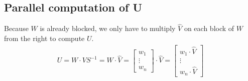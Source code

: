 \subsection{Parallel computation of U}

Because $W$ is already blocked, we only have to multiply  $\hat{ V }$ on each block of $W$ from the right to compute $U$.
\begin{align}
U = W \cdot VS^{-1} = 
W \cdot\hat{ V } = 
\begin{bmatrix} 
w_1 \\ \vdots \\ w_n  
\end{bmatrix} 
\cdot  \hat{ V } =  
\begin{bmatrix} 
w_1 \cdot  \hat{ V }  \\ \vdots \\ w_n \cdot \hat{ V }   
\end{bmatrix}
\end{align}















